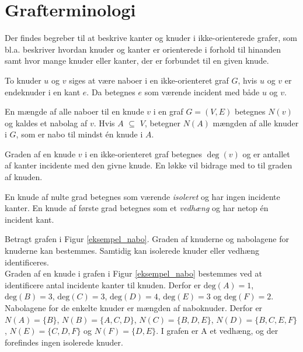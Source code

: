 \usetikzlibrary{arrows, positioning}
\section{Grafterminologi}

Der findes begreber til at beskrive kanter og knuder i ikke-orienterede grafer, som bl.a. beskriver hvordan knuder og kanter er orienterede i forhold til hinanden samt hvor mange knuder eller kanter, der er forbundet til en given knude.

\begin{defn}
To knuder $u$ og $v$ siges at være naboer i en ikke-orienteret graf $G$, hvis $u$ og $v$ er endeknuder i en kant $e$. Da betegnes $e$ som værende incident med både $u$ og $v$.
\end{defn}

\begin{defn}
En mængde af alle naboer til en knude $v$ i en graf $G=(V,E)$ betegnes $N(v)$ og kaldes et nabolag af $v$. Hvis $A$ $\subseteq$ $V$, betegner $N(A)$ mængden af alle knuder i $G$, som er nabo til mindst én knude i $A$.
\end{defn}

\begin{defn}
Graden af en knude $v$ i en ikke-orienteret graf betegnes $\deg(v)$ og er antallet af kanter incidente med den givne knude.  En løkke vil bidrage med to til graden af knuden. 
\end{defn}

\noindent En knude af nulte grad betegnes som værende \textit{isoleret} og har ingen incidente kanter. En knude af første grad betegnes som et \textit{vedhæng} og har netop én incident kant.

\begin{exmp}
Betragt grafen i Figur \ref{eksempel_nabo}. Graden af knuderne og nabolagene for knuderne kan bestemmes. Samtidig kan isolerede knuder eller vedhæng identificeres.\\
Graden af en knude i grafen i Figur \ref{eksempel_nabo} bestemmes ved at identificere antal incidente kanter til knuden. Derfor er $\textrm{deg}(A)=1$, $\textrm{deg}(B)=3$, $\textrm{deg}(C)=3$, $\textrm{deg}(D)=4$, $\textrm{deg}(E)=3$ og $\textrm{deg}(F)=2$. 
Nabolagene for de enkelte knuder er mængden af naboknuder. 
Derfor er $N(A)=\lbrace B \rbrace$, $N(B)=\lbrace A, C, D \rbrace$, $N(C)=\lbrace B, D, E \rbrace$, $N(D)=\lbrace B, C, E, F \rbrace$, $N(E)=\lbrace C, D, F \rbrace$ og $N(F)=\lbrace D, E \rbrace$. 
I grafen er A et vedhæng, og der forefindes ingen isolerede knuder.
\end{exmp}

